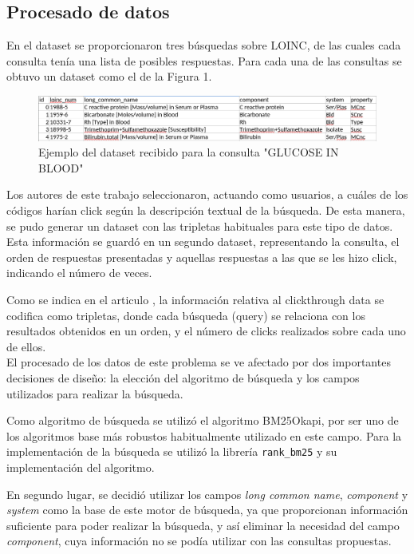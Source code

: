\documentclass[a4paper,12pt]{article}
\begin{document}
	\subsection{Procesado de datos}
	
	En el dataset se proporcionaron tres búsquedas sobre LOINC, de las cuales cada consulta tenía una lista de posibles respuestas.
	Para cada una de las consultas se obtuvo un dataset como el de la Figura 1.
	
	 \begin{figure}[H]
	 	\centering
	 	\includegraphics[width=\textwidth]{include/query_example_orig.png}
	 	\caption{Ejemplo del dataset recibido para la consulta "GLUCOSE IN BLOOD"}
	 \end{figure}
 
	Los autores de este trabajo seleccionaron, actuando como usuarios, a cuáles de los códigos harían click según la descripción textual de la búsqueda. De esta manera, se pudo generar un dataset con las tripletas habituales para este tipo de datos. Esta información se guardó en un segundo dataset, representando la consulta, el orden de respuestas presentadas y aquellas respuestas a las que se les hizo click, indicando el número de veces.
	
	Como se indica en el articulo \cite{articulo-clase}, la información relativa al clickthrough data se codifica como tripletas, donde cada búsqueda (query) se relaciona con los resultados obtenidos en un orden, y el número de clicks realizados sobre cada uno de ellos.\\
	
	El procesado de los datos de este problema se ve afectado por dos importantes decisiones de diseño: la elección del algoritmo de búsqueda y los campos utilizados para realizar la búsqueda.

	Como algoritmo de búsqueda se utilizó el algoritmo BM25Okapi, por ser uno de los algoritmos base más robustos habitualmente utilizado en este campo. Para la implementación de la búsqueda se utilizó la librería \texttt{rank\_bm25} y su implementación del algoritmo.
	
	En segundo lugar, se decidió utilizar los campos \textit{long common name}, \textit{component} y \textit{system} como la base de este motor de búsqueda, ya que proporcionan información suficiente para poder realizar la búsqueda, y así eliminar la necesidad del campo \textit{component}, cuya información no se podía utilizar con las consultas propuestas.
	
\end{document}
